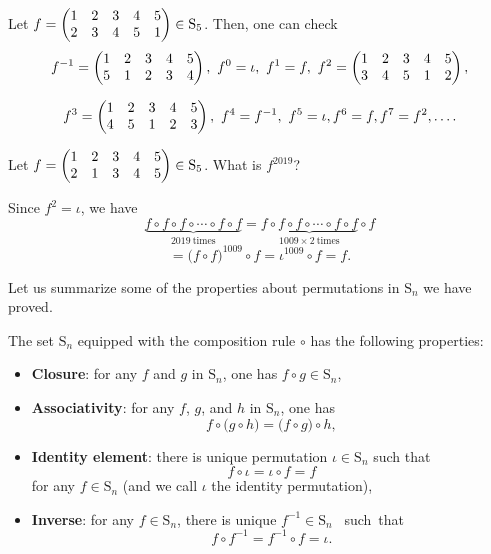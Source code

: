 \documentclass[11pt,dvipsnames]{book}
\numberwithin{figure}{section} %
\numberwithin{table}{section} %
\begin{document}
 \begin{example}
Let $f=\left(\begin{matrix} %
1 & 2 & 3 & 4 & 5\cr%
2 & 3 & 4 & 5 & 1\cr%
\end{matrix}\right)\in\mathrm{S}_5$.  Then, one can check
$$f^{-1}=\left(\begin{matrix} %
1 & 2 & 3 & 4 & 5\cr%
5 & 1 & 2 & 3 & 4\cr%
\end{matrix}\right),\  f^{0}=\iota,\  f^{1}= f,\  f^{2}=\left(\begin{matrix} %
1 & 2 & 3 & 4 & 5\cr%
3 & 4 & 5 & 1 & 2\cr%
\end{matrix}\right),
$$

$$
f^{3}=\left(\begin{matrix} %
1 & 2 & 3 & 4 & 5\cr%
4 & 5 & 1 & 2 & 3\cr%
\end{matrix}\right),\ 
f^{4}= f^{-1},\ 
f^{5} = \iota,  f^{6}= f,  f^{7}= f^2,  \ldots.
$$
\end{example}

\begin{exercise}  Let $f=\left(\begin{matrix} %
1 & 2 & 3 & 4 & 5\cr%
2 & 1 & 3 & 4 & 5\cr%
\end{matrix}\right)\in\mathrm{S}_5$. What is $f^{2019}$?
\begin{solution}
 Since $f^{2}=\iota$,  we have
$$
\underbrace{f\circ f\circ f\circ\cdots\circ f\circ f}_{2019\ \mathrm{times}}=\underbrace{f\circ f\circ f\circ\cdots\circ f\circ f}_{1009\times 2\ \mathrm{times}}\circ f$$
$$=\Big(f\circ f\Big)^{1009}\circ f=\iota^{1009}\circ f= f.%
$$
\end{solution}
\end{exercise}

Let us summarize some of the properties about permutations in $\mathrm{S}_{n}$  we have proved.

\begin{lemma}%
The set $\mathrm{S}_n$ equipped with the composition rule $\circ$ has the following
properties:
\begin{itemize}
\item {\bf Closure}: for any $f$ and $g$ in $\mathrm{S}_n$,  one has $f\circ g\in\mathrm{S}_n$, %

\item {\bf Associativity}: for any $f$, $g$, and $h$ in $\mathrm{S}_n$, one has
$$f\circ \Big(g\circ h\Big)=\Big(f\circ g\Big)\circ h,$$

\item {\bf Identity element}: there is unique permutation $\iota\in\mathrm{S}_n$ such that
$$ f\circ\iota=\iota\circ f=f$$
for any $f\in\mathrm{S}_n$ (and we call $\iota$ the identity permutation),%

\item {\bf Inverse}: for any $f\in\mathrm{S}_n$,  there is unique $f^{-1}\in\mathrm{S}_n$~ such~that
$$
f\circ f^{-1}=f^{-1}\circ f=\iota.
$$
\end{itemize}
\end{lemma}
\end{document}
